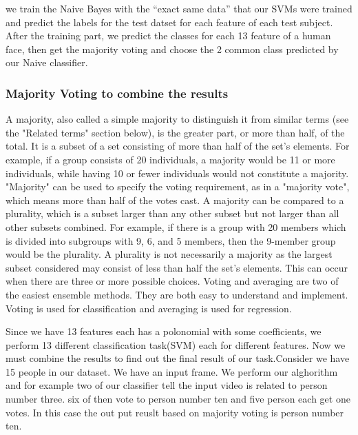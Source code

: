 \documentclass{article}
\begin{document}
{\begin{center}
\begin{tabular}{||c c||}
\end{tabular}
\end{center}

\par{ we train the Naive Bayes with the “exact same data” that our SVMs were trained and predict the labels for the test datset for each
feature of each test subject. After the training part, we predict the classes for each 13 feature of a human face, then get the majority voting and choose the 2 common class predicted by our Naive classifier.}
\subsubsection{Majority Voting to combine the results}
\par{A majority, also called a simple majority to distinguish it from similar terms (see the "Related terms" section below), is the greater part, or more than half, of the total. It is a subset of a set consisting of more than half of the set's elements. For example, if a group consists of 20 individuals, a majority would be 11 or more individuals, while having 10 or fewer individuals would not constitute a majority. "Majority" can be used to specify the voting requirement, as in a "majority vote", which means more than half of the votes cast. A majority can be compared to a plurality, which is a subset larger than any other subset but not larger than all other subsets combined. For example, if there is a group with 20 members which is divided into subgroups with 9, 6, and 5 members, then the 9-member group would be the plurality. A plurality is not necessarily a majority as the largest subset considered may consist of less than half the set's elements. This can occur when there are three or more possible choices. Voting and averaging are two of the easiest ensemble methods. They are both easy to understand and implement. Voting is used for classification and averaging is used for regression.}
\par{Since we have 13 features each has a polonomial with some coefficients, we perform 13 different classification task(SVM) each for different features. Now we must combine the results to find out the final result of our task.Consider we have 15 people in our dataset. We have an input frame. We perform our alghorithm and for example two of our classifier tell the input video is related to person number three. six of then vote to person number ten and five person each get one votes. In this case the out put reuslt based on majority voting is person number ten.}

}
\end{document}

